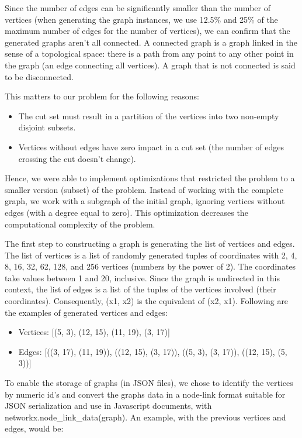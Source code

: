 \documentclass[]{revdetua}
\begin{document}
Since the number of edges can be significantly smaller than the number of vertices (when generating the graph instances, we use 12.5\% and 25\% of the maximum number of edges for the number of vertices), we can confirm that the generated graphs aren't all connected. A connected graph is a graph linked in the sense of a topological space: there is a path from any point to any other point in the graph (an edge connecting all vertices). A graph that is not connected is said to be disconnected.

This matters to our problem for the following reasons:
\begin{itemize}
\item The cut set must result in a partition of the vertices into two non-empty disjoint subsets.
\item Vertices without edges have zero impact in a cut set (the number of edges crossing the cut doesn't change).
\end{itemize}

Hence, we were able to implement optimizations that restricted the problem to a smaller version (subset) of the problem. Instead of working with the complete graph, we work with a subgraph of the initial graph, ignoring vertices without edges (with a degree equal to zero). This optimization decreases the computational complexity of the problem.

The first step to constructing a graph is generating the list of vertices and edges. The list of vertices is a list of randomly generated tuples of coordinates with 2, 4, 8, 16, 32, 62, 128, and 256 vertices (numbers by the power of 2). The coordinates take values between 1 and 20, inclusive. Since the graph is undirected in this context, the list of edges is a list of the tuples of the vertices involved  (their coordinates). Consequently, (x1, x2) is the equivalent of (x2, x1). Following are the examples of generated vertices and edges:

\begin{itemize}
\item Vertices: [(5, 3), (12, 15), (11, 19), (3, 17)]
\item Edges: [((3, 17), (11, 19)), ((12, 15), (3, 17)), ((5, 3), (3, 17)), ((12, 15), (5, 3))]
\end{itemize}

To enable the storage of graphs (in JSON files), we chose to identify the vertices by numeric id's and convert the graphs data in a node-link format suitable for JSON serialization and use in Javascript documents, with networkx.node\_link\_data(graph). An example, with the previous vertices and edges, would be:
\end{document}
